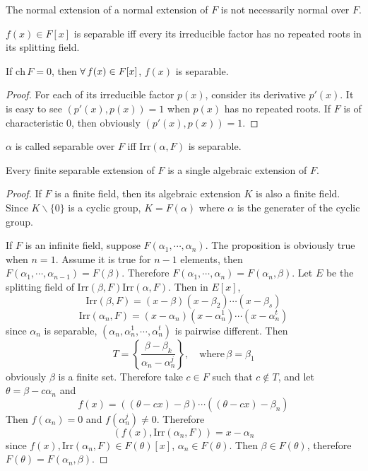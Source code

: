 \begin{remark}
    The normal extension of a normal extension of $F$ is not necessarily normal over $F$.
\end{remark}
\begin{definition}
    $f(x)\in F[x]$ is separable iff every its irreducible factor has no repeated roots in its splitting field.
\end{definition}
\begin{proposition}
    If $\mathrm{ch}\,F=0$, then $\forall\, f(x)\in F[x]$, $f(x)$ is separable.
\end{proposition}
\begin{proof}
    For each of its irreducible factor $p(x)$, consider its derivative $p'(x)$. It is easy to see $(p'(x),p(x))=1$ when $p(x)$ has no repeated roots. If $F$ is of characteristic $0$, then obviously $(p'(x),p(x))=1$.
\end{proof}
\begin{definition}
    $\alpha$ is called separable over $F$ iff $\mathrm{Irr}(\alpha,F)$ is separable.
\end{definition}
\begin{proposition}
    Every finite separable extension of $F$ is a single algebraic extension of $F$.
\end{proposition}
\begin{proof}
    If $F$ is a finite field, then its algebraic extension $K$ is also a finite field. Since $K\backslash\{0\}$ is a cyclic group, $K=F(\alpha)$ where $\alpha$ is the generater of the cyclic group.
    \par If $F$ is an infinite field, suppose $F(\alpha_1,\cdots,\alpha_n)$. The proposition is obviously true when $n=1$. Assume it is true for $n-1$ elements, then $F(\alpha_1,\cdots,\alpha_{n-1})=F(\beta)$. Therefore $F(\alpha_1,\cdots,\alpha_n)=F(\alpha_n,\beta)$. Let $E$ be the splitting field of $\mathrm{Irr}(\beta,F)\mathrm{Irr}(\alpha,F)$. Then in $E[x]$,
    $$
    \mathrm{Irr}(\beta,F)=(x-\beta)(x-\beta_2)\cdots(x-\beta_s)
    $$
    $$
    \mathrm{Irr}(\alpha_n,F)=(x-\alpha_n)(x-\alpha_n^1)\cdots(x-\alpha_n^t)
    $$
    since $\alpha_n$ is separable, $(\alpha_n,\alpha_n^1,\cdots,\alpha_n^t)$ is pairwise different. Then
    $$
    T=\left\{\dfrac{\beta-\beta_k}{\alpha_n-\alpha_n^j}\right\},\quad \mathrm{where}\,\beta=\beta_1
    $$
    obviously $\beta$ is a finite set. Therefore take $c\in F$ such that $c\not\in T$, and let $\theta=\beta-c\alpha_n$ and
    $$
    f(x)=((\theta-cx)-\beta)\cdots((\theta-cx)-\beta_n)
    $$
    Then $f(\alpha_n)=0$ and $f(\alpha_n^j)\neq 0$. Therefore
    $$
    (f(x),\mathrm{Irr}(\alpha_n,F))=x-\alpha_n
    $$
    since $f(x),\mathrm{Irr}(\alpha_n,F)\in F(\theta)[x]$, $\alpha_n\in F(\theta)$. Then $\beta\in F(\theta)$, therefore $F(\theta)=F(\alpha_n,\beta)$.
\end{proof}
